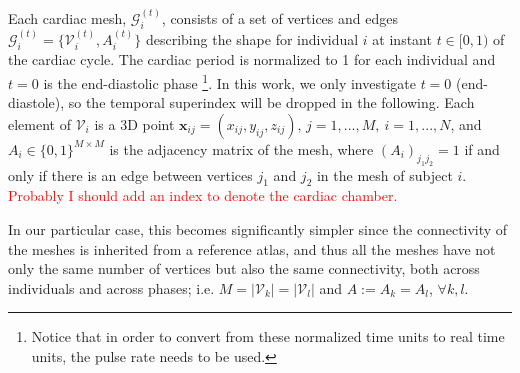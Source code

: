 \documentclass[twocolumn]{llncs}
\begin{document}
Each cardiac mesh, $\mathcal{G}_{i}^{(t)}$, consists of a set of vertices and edges $\mathcal{G}_{i}^{(t)}=\{\mathcal{V}_{i}^{(t)}, A_{i}^{(t)}\}$ describing the shape for individual $i$ at instant $t\in[0,1)$ of the cardiac cycle. The cardiac period is normalized to 1 for each individual and $t=0$ is the end-diastolic phase %
\footnote{Notice that in order to convert from these normalized time units to real time units, the pulse rate needs to be used.}. In this work, we only investigate $t=0$ (end-diastole), so the temporal superindex will be dropped in the following. Each element of $\mathcal{V}_i$ is a 3D point $\textbf{x}_{ij}=(x_{ij}, y_{ij}, z_{ij}),\, j=1,...,M,\ i=1,...,N$, and $A_{i}\in\{0,1\}^{M\times M}$ is the adjacency matrix of the mesh, where $(A_i)_{j_1j_2}=1$ if and only if there is an edge between vertices $j_1$ and $j_2$ in the mesh of subject $i$.
\textcolor{red}{Probably I should add an index to denote the cardiac chamber.}


In our particular case, this becomes significantly simpler since the connectivity of the meshes is inherited from a reference atlas, and thus all the meshes have not only the same number of vertices but also the same connectivity, both across individuals and across phases; i.e. $M=|\mathcal{V}_k|=|\mathcal{V}_l|$ and $A:=A_{k}=A_{l}$, $\forall k, l$.


\end{document}
